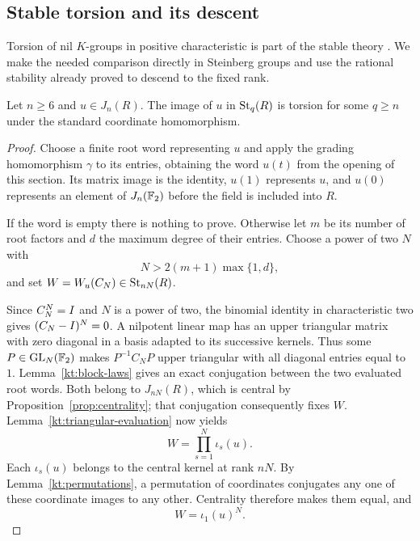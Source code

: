 \subsection{Stable torsion and its descent}

Torsion of nil $K$-groups in positive characteristic is part of the
stable theory
\cite[Corollary~3.3(d)]{Weibel1981}. We make the needed comparison
directly in Steinberg groups and use the rational stability already
proved to descend to the fixed rank.

\begin{proposition}\label{kt:stable-torsion}
Let $n\geq 6$ and $u\in J_n(R)$.  The image of $u$ in
$\operatorname{St}_q(R)$ is torsion for some $q\geq n$ under the standard coordinate
homomorphism.
\end{proposition}

\begin{proof}
Choose a finite root word representing $u$ and apply the grading
homomorphism $\gamma$ to its entries, obtaining the word $u(t)$
from the opening of this section. Its matrix image is the identity,
$u(1)$ represents $u$, and $u(0)$ represents an element of
$J_n(\mathbb F_2)$ before the field is included into $R$.

If the word is empty there is nothing to prove.  Otherwise let $m$
be its number of root factors and $d$ the maximum degree of their
entries.  Choose a power of two $N$ with
\[
 N>2(m+1)\max\{1,d\},
\]
and set $W=W_u(C_N)\in\operatorname{St}_{nN}(R)$.

Since $C_N^N=I$ and $N$ is a power of two, the binomial identity
in characteristic two gives $(C_N-I)^N=0$.  A nilpotent linear
map has an upper triangular matrix with zero diagonal in a basis
adapted to its successive kernels.  Thus some
$P\in\operatorname{GL}_N(\mathbb F_2)$ makes $P^{-1}C_NP$ upper triangular with all
diagonal entries equal to $1$.  Lemma~\ref{kt:block-laws} gives
an exact conjugation between the two evaluated root words.  Both
belong to $J_{nN}(R)$, which is central by
Proposition~\ref{prop:centrality}; that conjugation consequently
fixes $W$.  Lemma~\ref{kt:triangular-evaluation} now yields
\[
 W=\prod_{s=1}^{N}\iota_s(u).
\]
Each $\iota_s(u)$ belongs to the central kernel at rank $nN$.
By Lemma~\ref{kt:permutations}, a permutation of coordinates
conjugates any one of these coordinate images to any other.
Centrality therefore makes them equal, and
\begin{equation}\label{kt:cyclic-power}
 W=\iota_1(u)^N.
\end{equation}


\end{proof}

